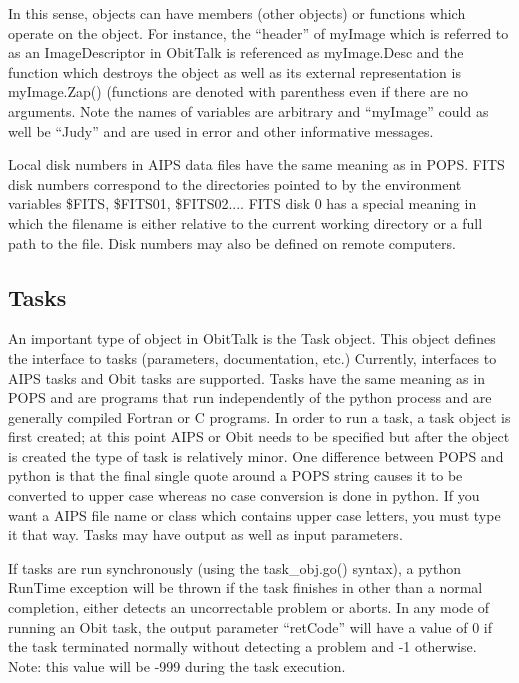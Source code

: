 \documentclass[11pt]{report}
\begin{document}
In this sense, objects can have members (other objects) or functions
which operate on the object. 
For instance, the ``header'' of myImage which is referred to as an
ImageDescriptor in ObitTalk is referenced as myImage.Desc and the
function which destroys the object as well as its external
representation is myImage.Zap() (functions are denoted with parenthess
even if there are no arguments.
Note the names of variables are arbitrary and ``myImage'' could as well
be ``Judy'' and are used in error and other informative messages.

Local disk numbers in AIPS data files have the same meaning as in
POPS.
FITS disk numbers correspond to the directories pointed to by the
environment variables \$FITS, \$FITS01, \$FITS02....  FITS disk 0 has
a special meaning in which the filename is either relative to the
current working directory or a full path to the file.
Disk numbers may also be defined on remote computers.

\subsection{Tasks}
   An important type of object in ObitTalk is the Task object.  
This object defines the interface to tasks (parameters, documentation,
etc.)
Currently, interfaces to AIPS tasks and Obit tasks are supported.
Tasks have the same meaning as in POPS and are  programs that run
independently of the python process and are generally compiled Fortran
or C programs. 
In order to run a task, a task object is first created; at this point
AIPS or Obit needs to be specified but after the object is created the
type of task is relatively minor.
One difference between POPS and python is that the final single quote
around a POPS string causes it to be converted to upper case whereas
no case conversion is done in python.
If you want a AIPS file name or class which contains upper case
letters, you must type it that way.
Tasks may have output as well as input parameters.

   If tasks are run synchronously (using the task\_obj.go() syntax), a
python RunTime exception will be thrown if the task finishes in other 
than a normal completion, either detects an uncorrectable problem or aborts.
In any mode of running an Obit task, the output parameter ``retCode'' will have  
a value of 0 if the task terminated normally without detecting a problem and 
-1 otherwise.  Note: this value will be -999 during the task execution.
\end{document}
